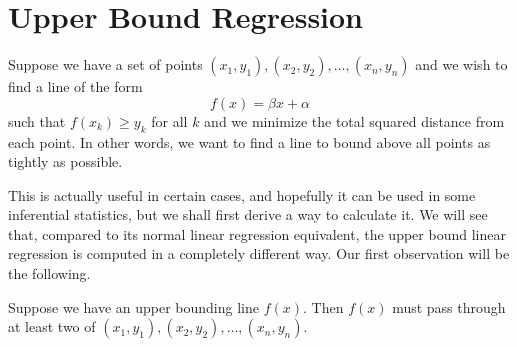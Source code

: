 \documentclass[a4paper, 12pt]{article}
\begin{document}
\section*{Upper Bound Regression}

\begin{sidebox}
    \begin{problem}
        Suppose we have a set of points \( (x_1, y_1), (x_2, y_2), \ldots, (x_n, y_n) \) and we wish to find a line of the form
        \[
            f(x) = \beta x + \alpha
        \]
        such that \( f(x_k) \ge y_k \) for all \( k \) and we minimize the total squared distance from each point. In other words, we want to find a line to bound above all points as tightly as possible.
    \end{problem}
\end{sidebox}

This is actually useful in certain cases, and hopefully it can be used in some inferential statistics, but we shall first derive a way to calculate it. We will see that, compared to its normal linear regression equivalent, the upper bound linear regression is computed in a completely different way. Our first observation will be the following.

\begin{observation}
    Suppose we have an upper bounding line \( f(x) \). Then \( f(x) \) must pass through at least two of \( (x_1, y_1), (x_2, y_2), \ldots, (x_n, y_n) \).
\end{observation}
\end{document}
